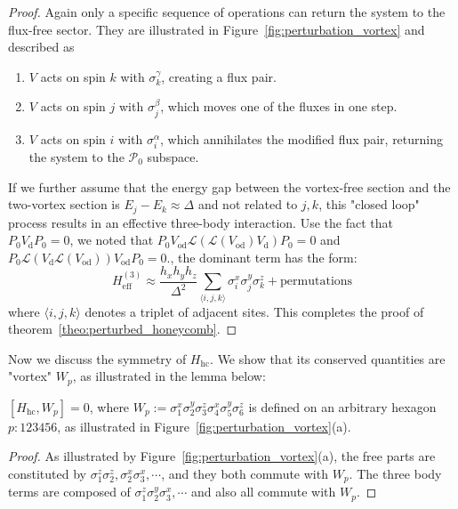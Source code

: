 \begin{proof}
Again only a specific sequence of operations can return the system to the flux-free sector. 
They are illustrated in Figure~\ref{fig:perturbation_vortex} and described as
\begin{enumerate}
    \item $V$ acts on spin $k$ with $\sigma_k^\gamma$, creating a flux pair.
    \item $V$ acts on spin $j$ with $\sigma_j^\beta$, which moves one of the fluxes in one step.
    \item $V$ acts on spin $i$ with $\sigma_i^\alpha$, which annihilates the modified flux pair, returning the system to the $\mathcal{P}_0$ subspace.
\end{enumerate}
If we further assume that the energy gap between the vortex-free section and the two-vortex section is  $E_j - E_k \approx \Delta $  and not related to $j,k$, this "closed loop" process results in an effective three-body interaction. Use the fact that $P_0V_{\mathrm{d}}P_0=0$, we noted that $P_0V_{\mathrm{od}} \mathcal{L}(\mathcal{L}(V_{\mathrm{od}})V_{\mathrm{d}})P_0=0$ and $P_0\mathcal{L}(V_{\mathrm{d}} \mathcal{L}(V_{\mathrm{od}}))V_{\mathrm{od}} P_0= 0$., the dominant term has the form:
\begin{equation}
    H_{\mathrm{eff}}^{(3)} \approx \frac{h_x h_y h_z}{\Delta^2} \sum_{\langle i,j,k \rangle} \sigma_i^x \sigma_j^y \sigma_k^z + \text{permutations}
\end{equation}
where $\langle i,j,k \rangle$ denotes a triplet of adjacent sites. This completes the proof of theorem~\ref{theo:perturbed_honeycomb}.
\end{proof}
Now we discuss the symmetry of $H_{\text{hc}}$. We show that its conserved quantities are "vortex" $W_p$, as illustrated in the lemma below:
\begin{lemma}\label{lemma:conserve_W}
    $[H_{\mathrm{hc}}, W_p] = 0$, where $W_p := \sigma_1^x \sigma_2^y \sigma_3^z \sigma_4^x\sigma_5^y \sigma_6^z$ is defined on an arbitrary hexagon $p:123456$, as illustrated in Figure~\ref{fig:perturbation_vortex}(a). 
\end{lemma}
\begin{proof}
    As illustrated by Figure~\ref{fig:perturbation_vortex}(a), the free parts are constituted by $\sigma_1^z\sigma_2^z,\sigma_2^x\sigma_3^x, \cdots$, and they both commute with $W_p$. The three body terms are composed of $\sigma_1^z\sigma_2^y\sigma_3^x,\cdots$ and also all commute with $W_p$.
\end{proof}
